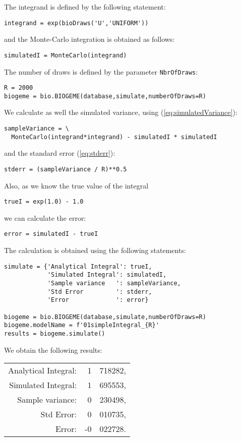 \documentclass[12pt,a4paper]{article}
\newcommand{\req}[1]{(\ref{#1})}
\begin{document}
The integrand is defined by the following statement:
\begin{lstlisting}
integrand = exp(bioDraws('U','UNIFORM'))
\end{lstlisting}
and the Monte-Carlo integration is obtained as follows:
\begin{lstlisting}
simulatedI = MonteCarlo(integrand)
\end{lstlisting}
The number of draws is defined by the parameter \lstinline$NbrOfDraws$:
\begin{lstlisting}
R = 2000
biogeme = bio.BIOGEME(database,simulate,numberOfDraws=R)
\end{lstlisting}
We calculate as well the simulated variance, using
\req{eq:simulatedVariance}:
\begin{lstlisting}
sampleVariance = \
  MonteCarlo(integrand*integrand) - simulatedI * simulatedI
\end{lstlisting}
and the standard error \req{eq:stderr}:
\begin{lstlisting}
stderr = (sampleVariance / R)**0.5
\end{lstlisting}
Also, as we know the true value of the integral
\begin{lstlisting}
trueI = exp(1.0) - 1.0 
\end{lstlisting}
we can calculate the error:
\begin{lstlisting}
error = simulatedI - trueI
\end{lstlisting}
The calculation is obtained using the following statements:
\begin{lstlisting}
simulate = {'Analytical Integral': trueI,
            'Simulated Integral': simulatedI,
            'Sample variance   ': sampleVariance,
            'Std Error         ': stderr,
            'Error             ': error}

biogeme = bio.BIOGEME(database,simulate,numberOfDraws=R)
biogeme.modelName = f'01simpleIntegral_{R}'
results = biogeme.simulate()
\end{lstlisting}
We obtain the following results:
\begin{center}
\begin{tabular}{rr@{.}l}
Analytical Integral: & 1&718282, \\
Simulated Integral: & 1&695553, \\
Sample variance: & 0&230498, \\
Std Error: & 0&010735, \\
Error: &-0&022728.
\end{tabular}
\end{center}
\end{document}
